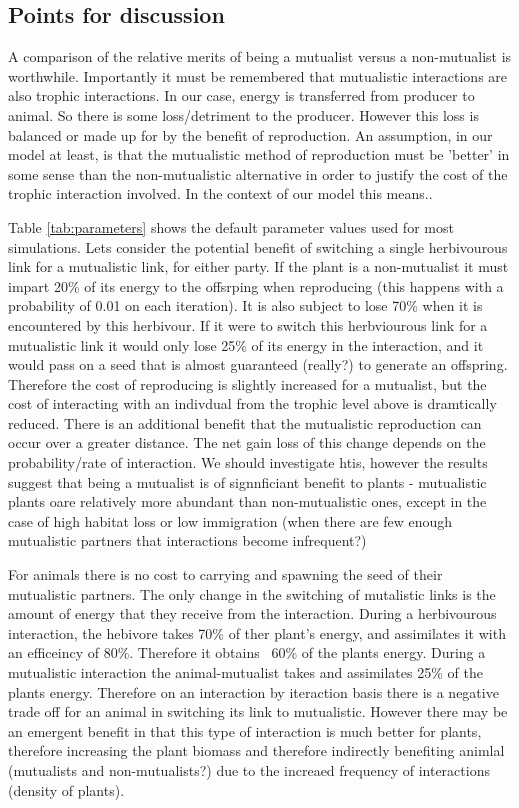 \begin{itemize}
\section{Points for discussion}

A comparison of the relative merits of being a mutualist versus a non-mutualist is worthwhile. Importantly it must be remembered that mutualistic interactions are also trophic interactions. In our case, energy is transferred from producer to animal. So there is some loss/detriment to the producer. However this loss is balanced or made up for by the benefit of reproduction. An assumption, in our model at least, is that the mutualistic method of reproduction must be 'better' in some sense than the non-mutualistic alternative in order to justify the cost of the trophic interaction involved. In the context of our model this means..

Table \ref{tab:parameters} shows the default parameter values used for most simulations. Lets consider the potential benefit of switching a single herbivourous link for a mutualistic link, for either party. If the plant is a non-mutualist it must impart 20\% of its energy to the offsrping when reproducing (this happens with a probability of 0.01 on each iteration). It is also subject to lose 70\% when it is encountered by this herbivour. If it were to switch this herbviourous link for a mutualistic link it would only lose 25\% of its energy in the interaction, and it would pass on a seed that is almost guaranteed (really?) to generate an offspring. Therefore the cost of reproducing is slightly increased for a mutualist, but the cost of interacting with an indivdual from the trophic level above is dramtically reduced. There is an additional benefit that the mutualistic reproduction can occur over a greater distance. The net gain loss of this change depends on the probability/rate of interaction. We should investigate htis, however the results suggest that being a mutualist is of signnficiant benefit to plants - mutualistic plants oare relatively more abundant than non-mutualistic ones, except in the case of high habitat loss or low immigration (when there are few enough mutualistic partners that interactions become infrequent?) 

For animals there is no cost to carrying and spawning the seed of their mutualistic partners. The only change in the switching of mutalistic links is the amount of energy that they receive from the interaction. During a herbivourous interaction, the hebivore takes 70\% of ther plant's energy, and assimilates it with an efficeincy of 80\%. Therefore it obtains ~60\% of the plants energy. During a mutualistic interaction the animal-mutualist takes and assimilates 25\% of the plants energy. Therefore on an interaction by iteraction basis there is a negative trade off for an animal in switching its link to mutualistic. However there may be an emergent benefit in that this type of interaction is much better for plants, therefore increasing the plant biomass and therefore indirectly benefiting animlal (mutualists and non-mutualists?) due to the increaed frequency of interactions (density of plants).       


\end{itemize}
